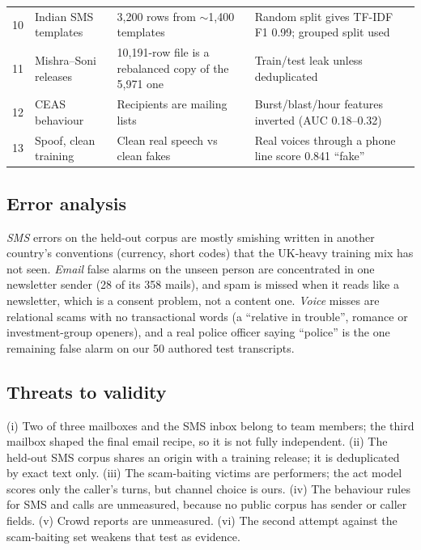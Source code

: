 \documentclass[conference]{IEEEtran}
\begin{document}
\begin{table}[t]
\begin{tabular}{@{}p{0.3cm}p{3.1cm}p{6.6cm}p{6.6cm}@{}}
10 & Indian SMS templates & 3,200 rows from $\sim$1,400 templates & Random split gives TF-IDF F1 0.99; grouped split used \\
11 & Mishra--Soni releases & 10,191-row file is a rebalanced copy of the 5,971 one & Train/test leak unless deduplicated \\
12 & CEAS behaviour & Recipients are mailing lists & Burst/blast/hour features inverted (AUC 0.18--0.32) \\
13 & Spoof, clean training & Clean real speech vs clean fakes & Real voices through a phone line score 0.841 ``fake'' \\
\bottomrule
\end{tabular}
\end{table}

\subsection{Error analysis}
\textit{SMS} errors on the held-out corpus are mostly smishing written in
another country's conventions (currency, short codes) that the UK-heavy training
mix has not seen. \textit{Email} false alarms on the unseen person are
concentrated in one newsletter sender (28 of its 358 mails), and spam is missed when it reads like a newsletter, which is a
consent problem, not a content one. \textit{Voice} misses are relational
scams with no transactional words (a ``relative in trouble'', romance or
investment-group openers), and a real police officer saying ``police'' is the
one remaining false alarm on our 50 authored test transcripts.

\subsection{Threats to validity}
(i) Two of three mailboxes and the SMS inbox belong to team members; the third
mailbox shaped the final email recipe, so it is not fully independent.
(ii) The held-out SMS corpus shares an origin with a training release; it is
deduplicated by exact text only. (iii) The scam-baiting victims are performers;
the act model scores only the caller's turns, but channel choice is ours.
(iv) The behaviour rules for SMS and calls are unmeasured, because no public
corpus has sender or caller fields. (v) Crowd reports are unmeasured. (vi) The
second attempt against the scam-baiting set weakens that test as evidence.

\end{document}
